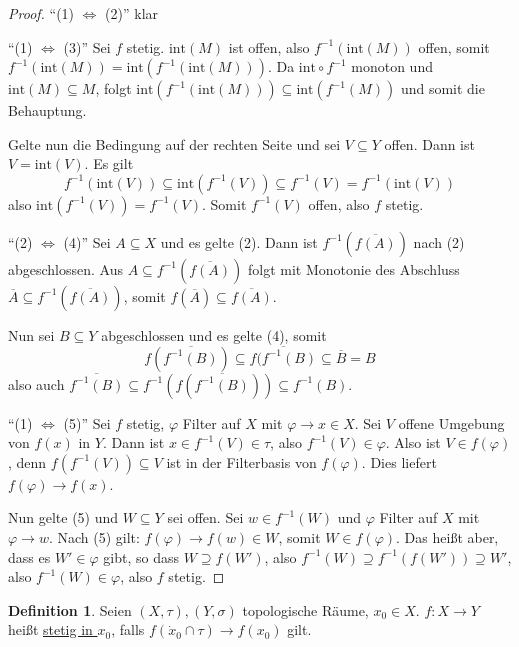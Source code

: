 \documentclass[12pt]{scrartcl}%
\theoremstyle{definition}
\newtheorem*{defn}{Definition}
\theoremstyle{remark}
\newcommand{\interior}{\text{int}}
\newcommand\Inv[1]{#1^{-1}}
\begin{document}
\begin{proof}
    \enquote{(1) $\Leftrightarrow$ (2)} klar

    \enquote{(1) $\Leftrightarrow$ (3)} Sei $f$ stetig. $\interior(M)$ ist offen, also $\Inv f(\interior(M))$ offen, somit $\Inv f(\interior(M)) = \interior(\Inv f(\interior(M)))$. Da $\interior \circ \Inv f$ monoton und $\interior(M) \subseteq M$, folgt $\interior(\Inv f(\interior(M))) \subseteq \interior(\Inv f(M))$ und somit die Behauptung.

    Gelte nun die Bedingung auf der rechten Seite und sei $V\subseteq Y$ offen. Dann ist $V=\interior(V)$. Es gilt $$\Inv f(\interior(V)) \subseteq \interior(\Inv f(V)) \subseteq \Inv f(V) = \Inv f(\interior(V))$$ also $\interior(\Inv f(V)) = \Inv f(V)$. Somit $\Inv f(V)$ offen, also $f$ stetig.

    \enquote{(2) $\Leftrightarrow$ (4)} Sei $A \subseteq X$ und es gelte (2). Dann ist $\Inv f\left(\overline{f(A)}\right)$ nach (2) abgeschlossen. Aus $A\subseteq \Inv f\left(\overline{f(A)}\right)$ folgt mit Monotonie des Abschluss $\overline{A} \subseteq \Inv f\left(\overline{f(A)}\right)$, somit $f\left(\overline{A}\right) \subseteq \overline{f(A)}$.

    Nun sei $B\subseteq Y$ abgeschlossen und es gelte (4), somit $$f\left(\overline{\Inv f(B)}\right) \subseteq \overline{f(\Inv f(B)} \subseteq \overline{B} = B$$ also auch $\overline{\Inv f(B)} \subseteq \Inv f\left(f\left(\overline{\Inv f(B)}\right)\right) \subseteq \Inv f(B)$.

    \enquote{(1) $\Leftrightarrow$ (5)} Sei $f$ stetig, $\varphi$ Filter auf $X$ mit $\varphi \to x\in X$. Sei $V$ offene Umgebung von $f(x)$ in $Y$. Dann ist $x\in \Inv f(V)\in \tau$, also $\Inv f(V)\in \varphi$. Also ist $V\in f(\varphi)$, denn $f(\Inv f(V)) \subseteq V$ ist in der Filterbasis von $f(\varphi)$. Dies liefert $f(\varphi) \to f(x)$.

    Nun gelte (5) und $W\subseteq Y$ sei offen. Sei $w\in \Inv f(W)$ und $\varphi$ Filter auf $X$ mit $\varphi \to w$. Nach (5) gilt: $f(\varphi) \to f(w) \in W$, somit $W\in f(\varphi)$. Das heißt aber, dass es $W'\in \varphi$ gibt, so dass $W\supseteq f(W')$, also $\Inv f(W) \supseteq \Inv f(f(W')) \supseteq W'$, also $\Inv f(W)\in \varphi$, also $f$ stetig.
\end{proof}

\begin{defn}
    Seien $(X,\tau),(Y,\sigma)$ topologische Räume, $x_0\in X$. $f:X\to Y$ heißt \underline{stetig in $x_0$}, falls $f(\dot x_0\cap \tau)\to f(x_0)$ gilt.
\end{defn}
\end{document}
